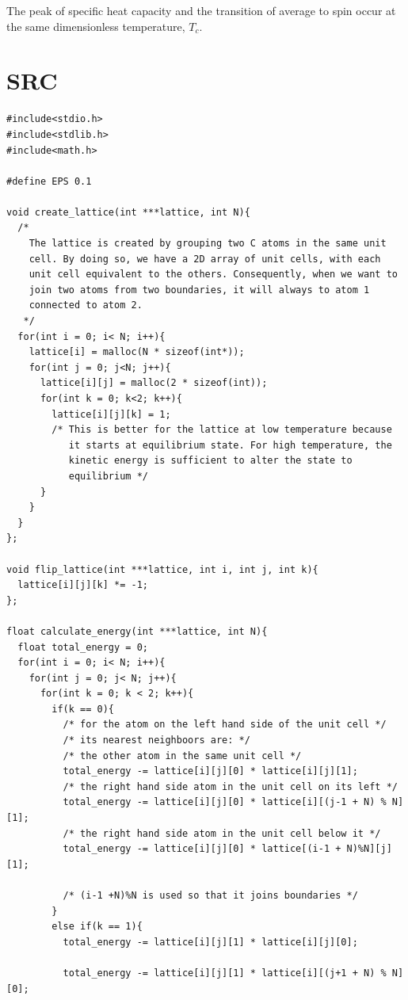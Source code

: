 \documentclass{article}
\begin{document}
The peak of specific heat capacity and the transition of average to
spin occur at the same dimensionless temperature, $T_c$.

\section{SRC}
\label{sec-5}

\hline
\begin{verbatim}
#include<stdio.h>
#include<stdlib.h>
#include<math.h>

#define EPS 0.1

void create_lattice(int ***lattice, int N){
  /*
    The lattice is created by grouping two C atoms in the same unit
    cell. By doing so, we have a 2D array of unit cells, with each
    unit cell equivalent to the others. Consequently, when we want to
    join two atoms from two boundaries, it will always to atom 1
    connected to atom 2.
   */
  for(int i = 0; i< N; i++){
    lattice[i] = malloc(N * sizeof(int*));
    for(int j = 0; j<N; j++){
      lattice[i][j] = malloc(2 * sizeof(int));
      for(int k = 0; k<2; k++){
        lattice[i][j][k] = 1;
        /* This is better for the lattice at low temperature because
           it starts at equilibrium state. For high temperature, the
           kinetic energy is sufficient to alter the state to
           equilibrium */
      }
    }
  }
};

void flip_lattice(int ***lattice, int i, int j, int k){
  lattice[i][j][k] *= -1;
};

float calculate_energy(int ***lattice, int N){
  float total_energy = 0;
  for(int i = 0; i< N; i++){
    for(int j = 0; j< N; j++){
      for(int k = 0; k < 2; k++){
        if(k == 0){
          /* for the atom on the left hand side of the unit cell */
          /* its nearest neighboors are: */
          /* the other atom in the same unit cell */
          total_energy -= lattice[i][j][0] * lattice[i][j][1];
          /* the right hand side atom in the unit cell on its left */
          total_energy -= lattice[i][j][0] * lattice[i][(j-1 + N) % N][1];
          /* the right hand side atom in the unit cell below it */
          total_energy -= lattice[i][j][0] * lattice[(i-1 + N)%N][j][1];

          /* (i-1 +N)%N is used so that it joins boundaries */
        }
        else if(k == 1){
          total_energy -= lattice[i][j][1] * lattice[i][j][0];

          total_energy -= lattice[i][j][1] * lattice[i][(j+1 + N) % N][0];


\end{verbatim}
\end{document}
